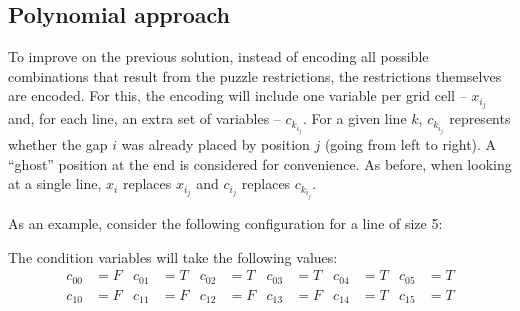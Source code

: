 \documentclass[12pt]{article}
\begin{document}
\subsection*{Polynomial approach}

To improve on the previous solution, instead of encoding all possible combinations that result from the puzzle restrictions, the restrictions themselves are encoded.
For this, the encoding will include one variable per grid cell -- $x_i_j$ and, for each line, an extra set of variables -- $c_k_i_j$.
For a given line $k$, $c_k_i_j$ represents whether the gap $i$ was already placed by position $j$ (going from left to right).
A ``ghost'' position at the end is considered for convenience.
As before, when looking at a single line, $x_i$ replaces $x_i_j$ and $c_i_j$ replaces $c_k_i_j$.

As an example, consider the following configuration for a line of size 5:

\begin{center}
\end{center}

The condition variables will take the following values:
\begin{align*}
c_{00} &= F & c_{01} &= T & c_{02} &= T & c_{03} &= T & c_{04} &= T & c_{05} &= T \\
c_{10} &= F & c_{11} &= F & c_{12} &= F & c_{13} &= F & c_{14} &= T & c_{15} &= T
\end{align*}
\end{document}
